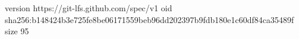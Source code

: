 version https://git-lfs.github.com/spec/v1
oid sha256:b148424b3e725fe8be06171559beb96dd202397b9fdb180e1c60df84ca35489f
size 95
